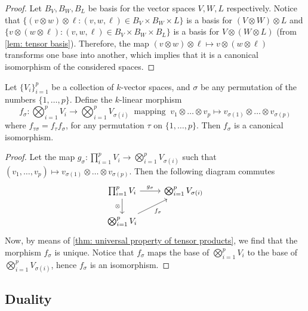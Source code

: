 \begin{proof}
  Let \(B_V, B_W, B_L\) be basis for the vector spaces \(V, W, L\) respectively.
  Notice that \(\{(v \otimes w) \otimes \ell : (v, w, \ell) \in B_V \times B_W
  \times L\}\) is a basis for \((V \otimes W) \otimes L\) and \(\{v \otimes (w
  \otimes \ell) : (v, w, \ell) \in B_V \times B_W \times B_L\}\) is a basis for
  \(V \otimes (W \otimes L)\) (from \cref{lem: tensor basis}). Therefore, the
  map \((v \otimes w) \otimes \ell \mapsto v \otimes (w \otimes \ell)\)
  transforms one base into another, which implies that it is a canonical
  isomorphism of the considered spaces.
\end{proof}

\begin{proposition}[Commutativity]\label{prop: commutativity tensor prod}
  Let \(\{V_i\}_{i=1}^p\) be a collection of \(k\)-vector spaces, and \(\sigma\)
  be any permutation of the numbers \(\{1, \dots, p\}\). Define the \(k\)-linear
  morphism
  \[
    f_\sigma : \bigotimes_{i=1}^p V_i \to \bigotimes_{i=1}^p V_{\sigma(i)}\
    \text{ mapping }\ v_1 \otimes \dots \otimes v_p \mapsto v_{\sigma(1)}
    \otimes \dots \otimes v_{\sigma(p)}
  \]
  where \(f_{\tau\sigma} = f_\tau f_\sigma\), for any permutation \(\tau\)
  on \(\{1, \dots, p\}\). Then \(f_\sigma\) is a canonical isomorphism.
\end{proposition}

\begin{proof}
  Let the map \(g_\sigma: \prod_{i=1}^p V_i \to \bigotimes_{i=1}^p
  V_{\sigma(i)}\) such that \((v_1, \dots, v_p) \mapsto v_{\sigma(1)} \otimes
  \dots \otimes v_{\sigma(p)}\). Then the following diagram commutes
  \[
    \begin{tikzcd}
      \prod_{i=1}^p V_i \ar[r, "g_\sigma"] \ar[d, swap, "\otimes"]
        &\bigotimes_{i=1}^p V_{\sigma(i)}\\
      \bigotimes_{i=1}^p V_i \ar[ur, swap, "f_\sigma"]
    \end{tikzcd}
  \]
  Now, by means of \cref{thm: universal property of tensor products}, we find
  that the morphism \(f_\sigma\) is unique. Notice that \(f_\sigma\) maps the
  base of \(\bigotimes_{i=1}^p V_i\) to the base of \(\bigotimes_{i=1}^p
  V_{\sigma(i)}\), hence \(f_\sigma\) is an isomorphism.
\end{proof}

\subsection{Duality}

